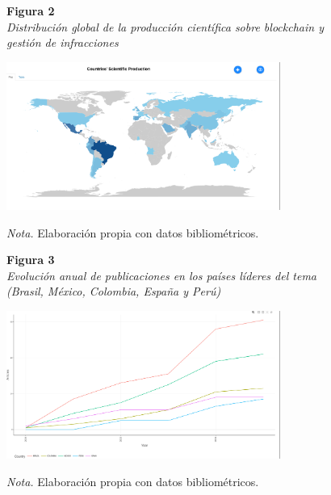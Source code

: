 \begin{figure}[htbp]
    \begin{flushleft}
        \textbf{Figura 2}\\[2em]
        \textit{Distribución global de la producción científica sobre blockchain y gestión de infracciones}
    \end{flushleft}
    \vspace{1em}
    \centering
    \includegraphics[width=0.8\textwidth]{Images/MapaBibliometrix.png}
    \vspace{2em}
    \begin{flushleft}
        \textit{Nota.} Elaboración propia con datos bibliométricos.
    \end{flushleft}
    \label{fig:mapa_bibliometrix}
\end{figure}

\begin{figure}[htbp]
    \begin{flushleft}
        \textbf{Figura 3}\\[2em]
        \textit{Evolución anual de publicaciones en los países líderes del tema (Brasil, México, Colombia, España y Perú)}
    \end{flushleft}
    \vspace{1em}
    \centering
    \includegraphics[width=0.8\textwidth]{Images/GraficoLineas.png}
    \vspace{2em}
    \begin{flushleft}
        \textit{Nota.} Elaboración propia con datos bibliométricos.
    \end{flushleft}
    \label{fig:grafico_lineas}
\end{figure}

